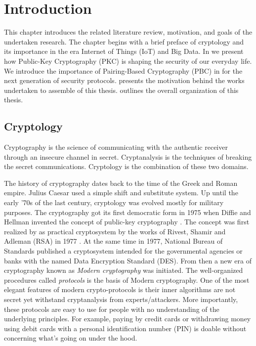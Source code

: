 \chapter{Introduction}
\label{chap:Introduction}
This chapter introduces the related literature review, motivation, and goals of the undertaken research.
The chapter begins with a brief preface of cryptology and its importance in the era Internet of Things (IoT) and Big Data.
In  we present how Public-Key Cryptography (PKC) is shaping the security of our everyday life.
We introduce the importance of Pairing-Based Cryptography (PBC) in  for the next generation of security protocols. 
 presents the motivation behind the works undertaken to assemble of this thesis.
 outlines the overall organization of this thesis.

\section{Cryptology }
\label{chap:sec:crypto}
Cryptography is the science of communicating with the authentic receiver through an insecure channel in secret. 
Cryptanalysis is the techniques of breaking the secret communications.
Cryptology is the combination of these two domains.

The history of cryptography dates back to the time of the Greek and Roman empire.
Julius Caesar used a simple shift and substitute system.
Up until the early '70s of the last century, cryptology was evolved mostly for military purposes. 
The cryptography got its first democratic form in 1975 when Diffie and Hellman invented the concept of public-key cryptography \cite{diffie1976new}. 
The concept was first realized by as practical cryptosystem by the works of Rivest, Shamir and Adleman (RSA) in 1977 \cite{rivest1978method}. 
At the same time in 1977, National Bureau of Standards published a cryptosystem intended for the governmental agencies or banks with the named Data Encryption Standard (DES).
From then a new era of cryptography known as \textit{Modern cryptography} was initiated.
The well-organized procedures called \textit{protocols} is the basis of Modern cryptography.
One of the most elegant features of modern crypto-protocols is their inner algorithms are not secret yet withstand cryptanalysis from experts/attackers.
More importantly, these protocols are easy to use for people with no understanding of the underlying principles.
For example, paying by credit cards or withdrawing money using debit cards with a personal identification number (PIN) is doable without concerning what’s going on under the hood. 

